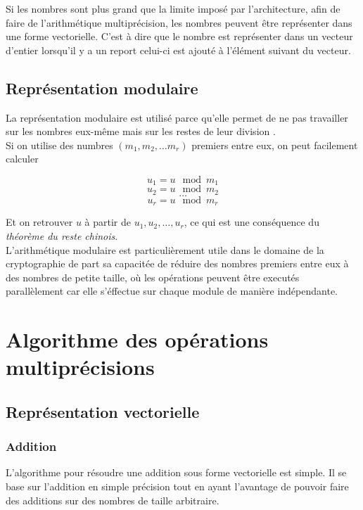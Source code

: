 \documentclass[letterpaper]{article}
\begin{document}
Si les nombres sont plus grand que la limite imposé par l'architecture, afin de
faire de l'arithmétique multiprécision, les nombres peuvent être représenter
dans une forme vectorielle. C'est à dire que le nombre est représenter dans un
vecteur d'entier lorsqu'il y a un report celui-ci est ajouté à l'élément
suivant du vecteur.


\subsection{Représentation modulaire}

La représentation modulaire est utilisé parce qu'elle permet de ne pas
travailler sur les nombres eux-même mais sur les restes de leur division
\cite{wikiamodulaire}.\\

Si on utilise des numbres $(m_1, m_2, \dots m_r)$ premiers entre eux,
on peut facilement calculer

  $$u_1 = u \mod m_1$$
  $$u_2 = u \mod m_2$$
  $$\dots$$
  $$u_r = u \mod m_r$$

Et on retrouver $u$ à partir de $u_1, u_2, \dots, u_r$, ce qui
est une conséquence du \emph{théorème du reste chinois}.\\

L'arithmétique modulaire est particulièrement utile dans le domaine de la
cryptographie de part sa capacitée de réduire des nombres premiers entre eux à
des nombres de petite taille, où les opérations peuvent être executés
parallèlement car elle s'éffectue sur chaque module de manière indépendante.

\section{Algorithme des opérations multiprécisions}

\subsection{Représentation vectorielle}

\subsubsection{Addition}

L'algorithme pour résoudre une addition sous forme vectorielle est simple.
Il se base sur l'addition en simple précision tout en ayant l'avantage de
pouvoir faire des additions sur des nombres de taille arbitraire. \\
\end{document}
